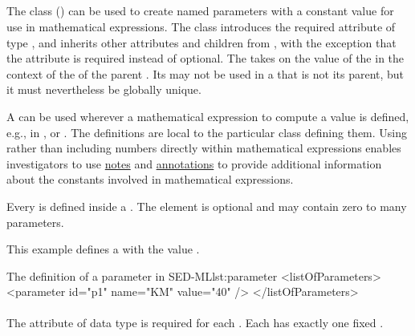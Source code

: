 \subsection{}
\label{class:parameter}
The  class () can be used to create named parameters with a constant value for use in mathematical expressions.
The  class introduces the required attribute \hyperref[sec:value]{} of type , and inherits other attributes and children from \SEDBase, with the exception that the attribute  is required instead of optional.  The  takes on the value of the  in the context of the \Math of the parent \Calculation.  Its  may not be used in a \Calculation that is not its parent, but it must nevertheless be globally unique.


A \Parameter can be used wherever a mathematical expression to compute a value is defined, e.g., in \ComputeChange, \FunctionalRange or \DataGenerator. The \Parameter definitions are local to the particular class defining them. Using  rather than including numbers directly within mathematical expressions enables investigators to use \hyperref[class:notes]{notes} and \hyperref[class:annotation]{annotations} to provide additional information about the constants involved in mathematical expressions.

Every \Parameter is defined inside a \ListOfParameters.  The element is optional and may contain zero to many parameters.

This example defines a   with the value . 
\begin{myXmlLst}{The definition of a parameter in SED-ML}{lst:parameter}
<listOfParameters>
	<parameter id="p1" name="KM" value="40" />
</listOfParameters>
\end{myXmlLst}


\paragraph*{}
\label{sec:value}
The  attribute of data type  is required for each \Parameter. Each \Parameter has exactly one fixed .

